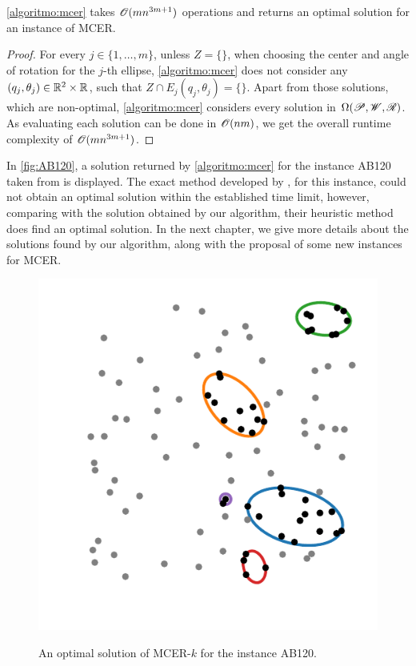 \begin{corolario}
	\autoref{algoritmo:mcer} takes $\mathscr{O}(mn^{3m+1})$ operations and returns an optimal solution for an instance of MCER.
\end{corolario}

\begin{proof}
	For every $j\in\{1, \dots, m\}$, unless $Z=\{\}$, when choosing the center and angle of rotation for the $j$-th ellipse, \autoref{algoritmo:mcer} does not consider any $(q_j, \theta_j) \in \mathbb{R}^2 \times \mathbb{R}$, such that $Z \cap E_j(q_j, \theta_j) = \{\}$. Apart from those solutions, which are non-optimal, \autoref{algoritmo:mcer} considers every solution in $\Omega(\mathscr{P}, \mathscr{W}, \mathscr{R})$. As evaluating each solution can be done in $\mathscr{O}(nm)$, we get the overall runtime complexity of $\mathscr{O}(mn^{3m+1})$.
\end{proof}

In \autoref{fig:AB120}, a solution returned by \autoref{algoritmo:mcer} for the instance AB120 taken from  is displayed. The exact method developed by , for this instance, could not obtain an optimal solution within the established time limit, however, comparing with the solution obtained by our algorithm, their heuristic method does find an optimal solution. In the next chapter, we give more details about the solutions found by our algorithm, along with the proposal of some new instances for MCER.


\begin{figure}[!htb]
	\centering
	\caption{An optimal solution of MCER-$k$ for the instance AB120.}
	\includegraphics[scale=.8]{tex/figures/AB120}
	\fautor
	\label{fig:AB120}
\end{figure}


